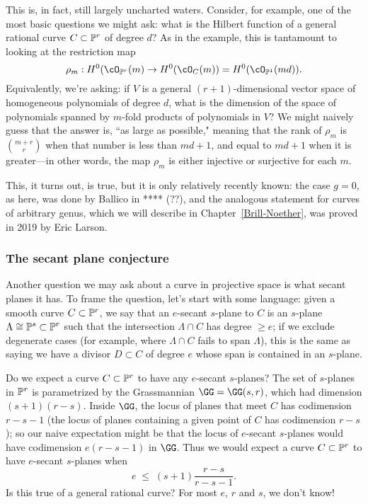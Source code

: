 This is, in fact, still largely uncharted waters. Consider, for example, one of the most basic questions we might ask: what is the Hilbert function of a general rational curve $C \subset \PP^r$ of degree $d$? As in the example, this is tantamount to looking at the restriction map
$$
\rho_m : H^0(\cO_{\PP^r}(m) \to H^0(\cO_C(m)) = H^0(\cO_{\PP^1}(md)).
$$
Equivalently, we're asking: if $V$ is a general  $(r+1)$-dimensional vector space of homogeneous polynomials of degree $d$, what is the dimension of the space of polynomials spanned by $m$-fold products of polynomials in $V$? We might naively guess that the answer is, ``as large as possible," meaning that the rank of $\rho_m$ is $\binom{m+r}{r}$ when that number is less than $md+1$, and equal to $md+1$ when it is greater---in other words, the map $\rho_m$ is either injective or surjective for each $m$.

This, it turns out, is true, but it is only relatively recently known: the case $g=0$, as here, was done by Ballico in **** (??), and the analogous statement for curves of arbitrary genus, which we will describe in Chapter~\ref{Brill-Noether}, was proved in 2019 by Eric Larson.

\subsubsection{The secant plane conjecture}

Another question we may ask about a curve in projective space is what secant planes it has. To frame the question, let's start with some language: given a smooth curve $C \subset \PP^r$, we say that an $e$-secant $s$-plane to $C$ is an $s$-plane $\Lambda \cong \PP^s \subset \PP^r$ such that the intersection $\Lambda \cap C$ has degree $\geq e$; if we exclude degenerate cases (for example, where $\Lambda \cap C$ fails to span $\Lambda$), this is the same as saying we have a divisor $D \subset C$ of degree $e$ whose span is contained in an $s$-plane.

Do we expect a curve $C \subset \PP^r$ to have any $e$-secant $s$-planes? The set of $s$-planes in $\PP^r$ is parametrized by the Grassmannian $\GG = \GG(s,r)$, which had dimension $(s+1)(r-s)$. Inside $\GG$, the locus of planes that meet $C$ has codimension $r-s-1$ (the locus of planes containing a given point of $C$ has codimension $r-s$); so our naive expectation might be that the locus of $e$-secant $s$-planes would have codimension $e(r-s-1)$ in $\GG$. Thus we would expect a curve $C \subset \PP^r$ to have $e$-secant $s$-planes when 
$$
e \; \leq \; (s+1)\frac{r-s}{r-s-1}.
$$
Is this true of a general rational curve? For most $e$, $r$ and $s$, we don't know!

